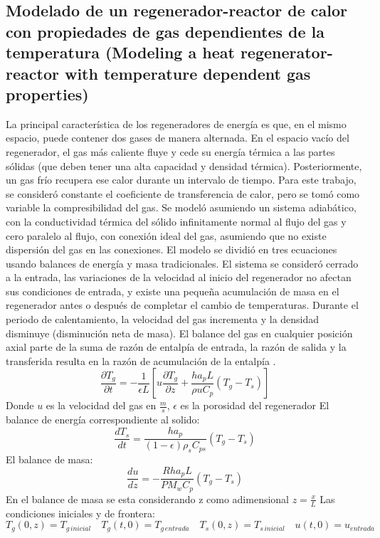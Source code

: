 \documentclass[12pt,letterpaper,final]{article}%
\begin{document}
\subsection*{Modelado de un regenerador-reactor de calor con propiedades de gas dependientes de la temperatura (Modeling a heat regenerator-reactor with temperature dependent gas properties)}
La principal característica de los regeneradores de energía es que, en el mismo espacio, puede contener dos gases de manera alternada. En el espacio vacío del regenerador, el gas más caliente fluye y cede su energía térmica a las partes sólidas (que deben tener una alta capacidad y densidad térmica). Posteriormente, un gas frío recupera ese calor durante un intervalo de tiempo. Para este trabajo, se consideró constante el coeficiente de transferencia de calor, pero se tomó como variable la compresibilidad del gas. Se modeló asumiendo un sistema adiabático, con la conductividad térmica del sólido infinitamente normal al flujo del gas y cero paralelo al flujo, con conexión ideal del gas, asumiendo que no existe dispersión del gas en las conexiones. El modelo se dividió en tres ecuaciones usando balances de energía y masa tradicionales. El sistema se consideró cerrado a la entrada, las variaciones de la velocidad al inicio del regenerador no afectan sus condiciones de entrada, y existe una pequeña acumulación de masa en el regenerador antes o después de completar el cambio de temperaturas. Durante el periodo de calentamiento, la velocidad del gas incrementa y la densidad disminuye (disminución neta de masa). El balance del gas en cualquier posición axial parte de la suma de razón de entalpía de entrada, la razón de salida y la transferida resulta en la razón de acumulación de la entalpía \cite{Kulkarni1992}.
\begin{equation}
	\frac{\partial T_g}{\partial t} = -\frac{1}{\epsilon L}[u\frac{\partial T_g}{\partial z}+ \frac{ha_p L}{\rho u C_p}(T_g-T_s)]
\end{equation}
Donde $u$ es la velocidad del gas en $\frac{m}{s}$, $\epsilon$ es la porosidad del regenerador
\newline
El balance de energía correspondiente al solido:
\begin{equation}
	\frac{dT_s}{dt} = \frac{ha_p}{(1-\epsilon)\rho_s C_{ps}}(T_g-T_s)
\end{equation}
El balance de masa:
\begin{equation}
	\frac{du}{dz} = -\frac{Rha_pL}{PM_wC_p}(T_g-T_s)
\end{equation}
En el balance de masa se esta considerando z como adimensional $z=\frac{x}{L}$
\newline
Las condiciones iniciales y de frontera:
\begin{equation*}
	T_g(0,z)=T_{g \,inicial} \quad T_g(t,0)=T_{g \,entrada} \quad T_s(0,z)= T_{s \, inicial} \quad u(t,0) = u_{entrada}
\end{equation*}
\end{document}
